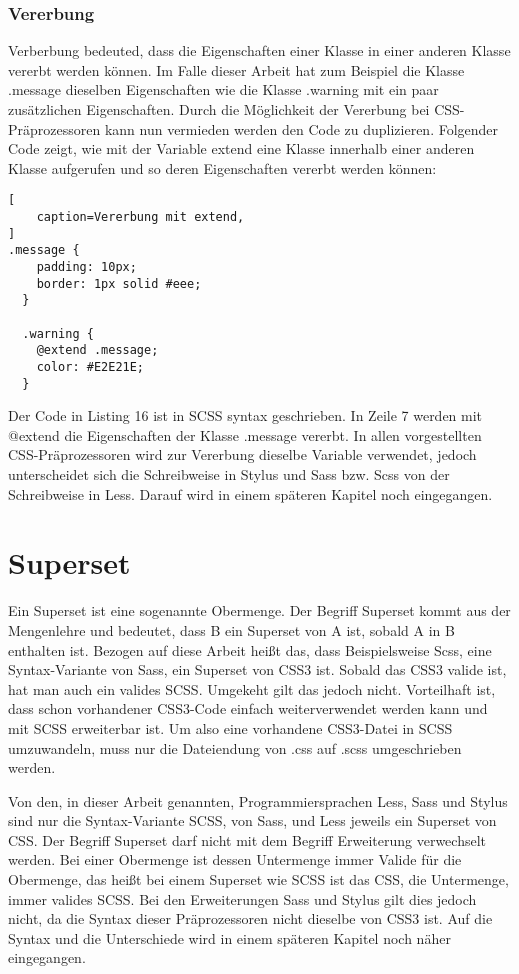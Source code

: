\subsubsection{Vererbung}
Verberbung bedeuted, dass die Eigenschaften einer Klasse in einer anderen Klasse vererbt werden können. Im Falle dieser Arbeit hat zum Beispiel die Klasse .message dieselben Eigenschaften wie die Klasse .warning mit ein paar zusätzlichen Eigenschaften. Durch die Möglichkeit der Vererbung bei CSS-Präprozessoren kann nun vermieden werden den Code zu duplizieren. Folgender Code zeigt, wie mit der Variable extend eine Klasse innerhalb einer anderen Klasse aufgerufen und so deren Eigenschaften vererbt werden können:
\begin{lstlisting}[
	caption=Vererbung mit extend,
]
.message {
    padding: 10px;
    border: 1px solid #eee;
  }

  .warning {
    @extend .message;
    color: #E2E21E;
  }
\end{lstlisting}
Der Code in Listing 16 ist in SCSS syntax geschrieben. In Zeile 7 werden mit @extend die Eigenschaften der Klasse .message vererbt. In allen vorgestellten CSS-Präprozessoren wird zur Vererbung dieselbe Variable verwendet, jedoch unterscheidet sich die Schreibweise in Stylus und Sass bzw. Scss von der Schreibweise in Less. Darauf wird in einem späteren Kapitel noch eingegangen.
\newpage
\section{Superset} 
Ein Superset ist eine sogenannte Obermenge. Der Begriff Superset kommt aus der Mengenlehre und bedeutet, dass B ein Superset von A ist, sobald A in B enthalten ist. Bezogen auf diese Arbeit heißt das, dass Beispielsweise Scss, eine Syntax-Variante von Sass, ein Superset von CSS3 ist.\newline
Sobald das CSS3 valide ist, hat man auch ein valides SCSS. Umgekeht gilt das jedoch nicht.  Vorteilhaft ist, dass schon vorhandener CSS3-Code einfach weiterverwendet werden kann und mit SCSS erweiterbar ist. Um also eine vorhandene CSS3-Datei in SCSS umzuwandeln, muss nur die Dateiendung von .css auf .scss umgeschrieben werden.

Von den, in dieser Arbeit genannten, Programmiersprachen Less, Sass und Stylus sind nur die Syntax-Variante SCSS, von Sass, und Less jeweils ein Superset von CSS. \newline
Der Begriff Superset darf nicht mit dem Begriff Erweiterung verwechselt werden.\newline
Bei einer Obermenge ist dessen Untermenge immer Valide für die Obermenge, das heißt bei einem Superset wie SCSS ist das CSS, die Untermenge, immer valides SCSS.\newline
Bei den Erweiterungen Sass und Stylus gilt dies jedoch nicht, da die Syntax dieser Präprozessoren nicht dieselbe von CSS3 ist. Auf die Syntax und die Unterschiede wird in einem späteren Kapitel noch näher eingegangen.

